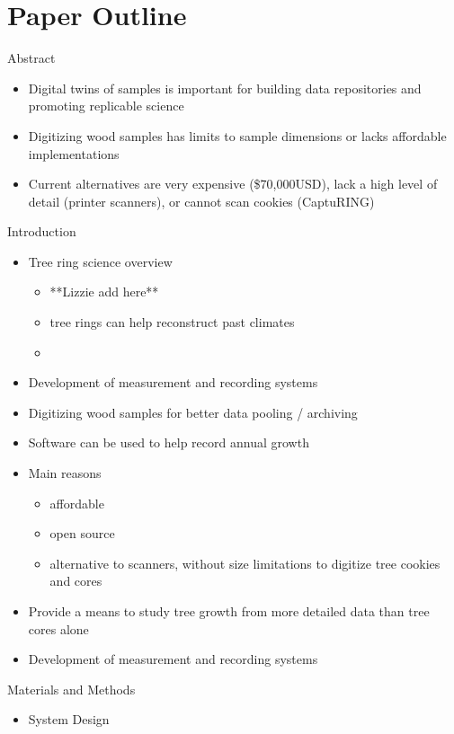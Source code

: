 \documentclass{article}
\begin{document}
\section {Paper Outline}
\begin{outline}[itemize]

\1 Abstract
\begin{itemize}
	\item  Digital twins of samples is important for building data repositories and promoting replicable science
	\item  Digitizing wood samples has limits to sample dimensions or lacks affordable implementations
	\item 	Current alternatives are very expensive (\$70,000USD), lack a high level of detail (printer scanners), or cannot scan cookies (CaptuRING)
\end{itemize}
\item Introduction
	\begin{itemize}
	\item Tree ring science overview
		\begin{itemize}
		\item **Lizzie add here**
		\item tree rings can help reconstruct past climates 
		\item 
		\end{itemize}
	\item Development of measurement and recording systems
	\item Digitizing wood samples for better data pooling / archiving
	\item Software can be used to help record annual growth 
	\item Main reasons 
		\begin{itemize}
		\item affordable
		\item open source
		\item  alternative to scanners, without size limitations to digitize tree cookies and cores 
		\end{itemize}
	\item Provide a means to study tree growth from more detailed data than tree cores alone
	\item Development of measurement and recording systems
	\end{itemize}
\item Materials and Methods
	\begin{itemize}
	\item System Design 

\end{itemize}
\end{outline}
\end{document}

